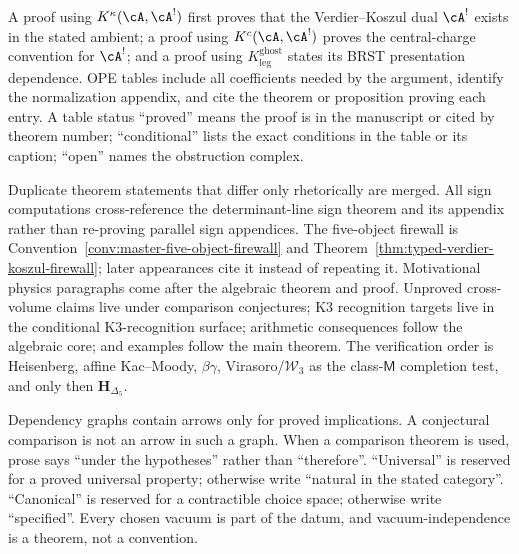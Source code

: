 \begin{convention}
A proof using \(K^\kappa(\cA,\cA^!)\) first proves that the
Verdier--Koszul dual \(\cA^!\) exists in the stated ambient; a proof
using \(K^c(\cA,\cA^!)\) proves the central-charge convention for
\(\cA^!\); and a proof using
\(K^{\mathrm{ghost}}_{\mathrm{leg}}\) states its BRST presentation
dependence.  OPE tables include all coefficients needed by the
argument, identify the normalization appendix, and cite the theorem or
proposition proving each entry.  A table status ``proved'' means the
proof is in the manuscript or cited by theorem number; ``conditional''
lists the exact conditions in the table or its caption; ``open'' names
the obstruction complex.

Duplicate theorem statements that differ only rhetorically are merged.
All sign computations cross-reference the determinant-line sign theorem
and its appendix rather than re-proving parallel sign appendices.  The
five-object firewall is Convention~\ref{conv:master-five-object-firewall}
and Theorem~\ref{thm:typed-verdier-koszul-firewall}; later appearances
cite it instead of repeating it.  Motivational
physics paragraphs come after the algebraic theorem and proof.  Unproved
cross-volume claims live under comparison conjectures; K3 recognition
targets live in the conditional K3-recognition surface; arithmetic
consequences follow the algebraic core; and examples follow the main
theorem.  The verification order is Heisenberg, affine Kac--Moody,
\(\beta\gamma\), Virasoro/\(\mathcal W_3\) as the class-\(\mathsf M\)
completion test, and only then \(\mathbf H_{\Delta_5}\).

Dependency graphs contain arrows only for proved implications.  A
conjectural comparison is not an arrow in such a graph.  When a
comparison theorem is used, prose says ``under the hypotheses'' rather
than ``therefore''.  ``Universal'' is reserved for a proved universal
property; otherwise write ``natural in the stated category''.
``Canonical'' is reserved for a contractible choice space; otherwise
write ``specified''.  Every chosen vacuum is part of the datum, and
vacuum-independence is a theorem, not a convention.


\end{convention}
